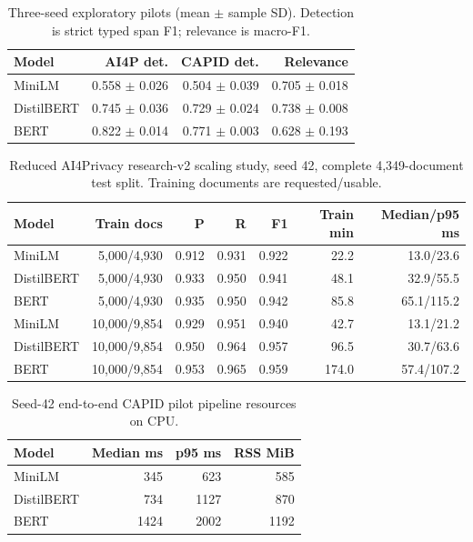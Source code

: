 \begin{table}[t]
\centering
\caption{Three-seed exploratory pilots (mean $\pm$ sample SD). Detection is strict typed span F1; relevance is macro-F1.}
\label{tab:multiseed}
\begin{tabular}{lrrr}
\toprule
Model & AI4P det. & CAPID det. & Relevance \\
\midrule
MiniLM & 0.558 $\pm$ 0.026 & 0.504 $\pm$ 0.039 & 0.705 $\pm$ 0.018 \\
DistilBERT & 0.745 $\pm$ 0.036 & 0.729 $\pm$ 0.024 & 0.738 $\pm$ 0.008 \\
BERT & 0.822 $\pm$ 0.014 & 0.771 $\pm$ 0.003 & 0.628 $\pm$ 0.193 \\
\bottomrule
\end{tabular}
\end{table}

\begin{table}[t]
\centering
\caption{Reduced AI4Privacy research-v2 scaling study, seed 42, complete 4,349-document test split. Training documents are requested/usable.}
\label{tab:scaling}
\begin{tabular}{lrrrrrr}
\toprule
Model & Train docs & P & R & F1 & Train min & Median/p95 ms \\
\midrule
MiniLM & 5,000/4,930 & 0.912 & 0.931 & 0.922 & 22.2 & 13.0/23.6 \\
DistilBERT & 5,000/4,930 & 0.933 & 0.950 & 0.941 & 48.1 & 32.9/55.5 \\
BERT & 5,000/4,930 & 0.935 & 0.950 & 0.942 & 85.8 & 65.1/115.2 \\
MiniLM & 10,000/9,854 & 0.929 & 0.951 & 0.940 & 42.7 & 13.1/21.2 \\
DistilBERT & 10,000/9,854 & 0.950 & 0.964 & 0.957 & 96.5 & 30.7/63.6 \\
BERT & 10,000/9,854 & 0.953 & 0.965 & 0.959 & 174.0 & 57.4/107.2 \\
\bottomrule
\end{tabular}
\end{table}

\begin{table}[t]
\centering
\caption{Seed-42 end-to-end CAPID pilot pipeline resources on CPU.}
\label{tab:pipeline}
\begin{tabular}{lrrr}
\toprule
Model & Median ms & p95 ms & RSS MiB \\
\midrule
MiniLM & 345 & 623 & 585 \\
DistilBERT & 734 & 1127 & 870 \\
BERT & 1424 & 2002 & 1192 \\
\bottomrule
\end{tabular}
\end{table}

